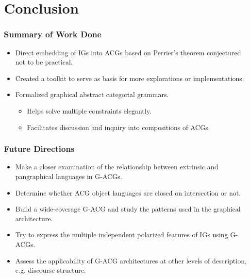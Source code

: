 \documentclass{beamer}
\begin{document}
\section{Conclusion}

\begin{frame}
  \frametitle{Summary of Work Done}

  \begin{itemize}
  \item Direct embedding of IGs into ACGs based on Perrier's theorem
    conjectured not to be practical.
  \item Created a toolkit to serve as basis for more explorations or
    implementations.
  \item Formalized graphical abstract categorial grammars.
    \begin{itemize}
    \item Helps solve multiple constraints elegantly.
    \item Facilitates discussion and inquiry into compositions of ACGs.
    \end{itemize}
  \end{itemize}
\end{frame}


\begin{frame}
  \frametitle{Future Directions}

  \begin{itemize}
  \item Make a closer examination of the relationship between extrinsic
    and pangraphical languages in G-ACGs.
  \item Determine whether ACG object languages are closed on intersection
    or not.
  \item Build a wide-coverage G-ACG and study the patterns used in the
    graphical architecture.
  \item Try to express the multiple independent polarized features of IGs
    using G-ACGs.
  \item Assess the applicability of G-ACG architectures at other levels
    of description, e.g. discourse structure.
  \end{itemize}
\end{frame}


\appendix
{}
\setcounter{finalframe}{\value{framenumber}}
\end{document}
